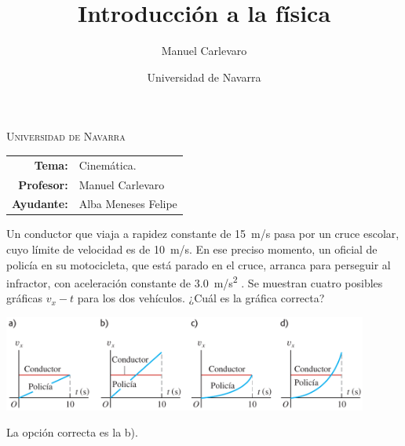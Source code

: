 \documentclass[11pt]{article}
\title{Introducción a la física}
\author{Manuel Carlevaro}
\date{Universidad de Navarra}
\begin{document}

\begin{center}
\end{center} 

\begin{center}
\vspace{1em}
\Large{\textsc{Universidad de Navarra}} 
\end{center}

 \vspace{1em}

\begin{center}
\begin{tabular}{r l}
 \textbf{Tema:} & Cinemática.\\
 \textbf{Profesor:} & Manuel Carlevaro \\
 \textbf{Ayudante:} & Alba Meneses Felipe
\end{tabular}\end{center}

\vspace{2em}

\begin{exercise}
    Un conductor que viaja a rapidez constante de \qty{15}{m/s} pasa por un cruce escolar, cuyo límite de velocidad es de \qty{10}{m/s}. En ese preciso momento, un oficial de policía en su motocicleta, que está parado en el cruce, arranca para perseguir al infractor, con aceleración constante de \qty{3.0}{m/s^2} . Se muestran cuatro posibles gráficas $v_x - t$ para los dos vehículos. ¿Cuál es la gráfica correcta?
\begin{center}
    \includegraphics[width=0.9\textwidth]{figs/activ-01.png}
\end{center}
\end{exercise}
\begin{solution}
    La opción correcta es la b).
\end{solution}
\end{document}
